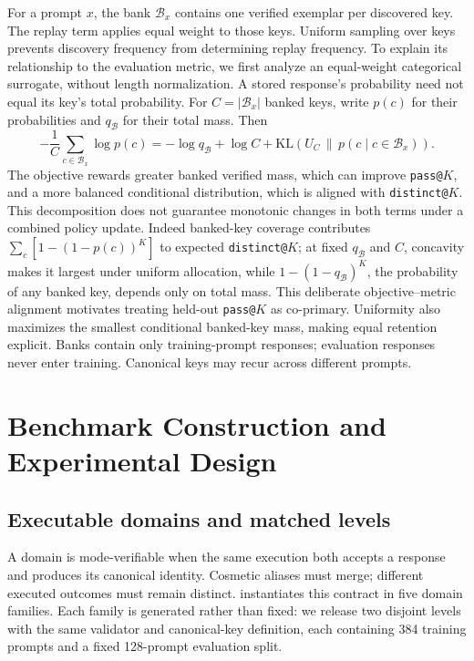 For a prompt $x$, the bank $\mathcal B_x$ contains one verified exemplar per
discovered key. The replay term applies equal weight to those keys.
Uniform sampling over keys prevents discovery frequency from determining replay
frequency. To explain its relationship to the evaluation metric, we first
analyze an equal-weight categorical surrogate, without length normalization.
A stored response's probability need not equal its key's total probability.
For $C=|\mathcal B_x|$ banked keys, write $p(c)$ for their probabilities
and $q_{\mathcal B}$ for their total mass. Then
\begin{equation}
 -\frac1C\sum_{c\in\mathcal B_x}\log p(c)
 =-\log q_{\mathcal B}+\log C+
   \mathrm{KL}\!\left(U_C\,\|\,
   p(c\mid c\in\mathcal B_x)\right).
 \label{eq:replay-bank-decomposition}
\end{equation}
The objective rewards greater banked verified mass, which can improve
\texttt{pass@}$K$, and a more balanced conditional distribution, which is
aligned with \texttt{distinct@}$K$. This decomposition does not guarantee
monotonic changes in both terms under a combined policy update. Indeed banked-key coverage contributes
$\sum_c[1-(1-p(c))^K]$ to expected \texttt{distinct@}$K$; at fixed
$q_{\mathcal B}$ and $C$, concavity makes it largest under uniform allocation,
while $1-(1-q_{\mathcal B})^K$, the probability of any banked key, depends
only on total mass. This deliberate objective--metric alignment motivates
treating held-out \texttt{pass@}$K$ as co-primary. Uniformity also maximizes the
smallest conditional banked-key mass, making equal retention explicit. Banks
contain only training-prompt responses; evaluation responses never enter
training. Canonical keys may recur across different prompts.



\section{Benchmark Construction and Experimental Design}
\label{app:experimental-design}

\subsection{Executable domains and matched levels}
\label{app:domain-overview}

A domain is mode-verifiable when the same execution both accepts a response and
produces its canonical identity. Cosmetic aliases must merge; different
executed outcomes must remain distinct. \mb{} instantiates this contract in
five domain families. Each family is generated rather than fixed: we release
two disjoint levels with the same validator and canonical-key definition, each
containing 384 training prompts and a fixed 128-prompt evaluation split.

